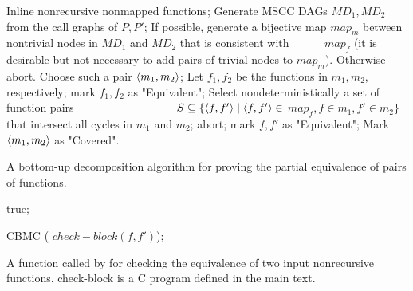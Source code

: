 \begin{algorithm}
\begin{algorithmic}[1]
\State \label{step:inline} Inline nonrecursive nonmapped functions;
\State \label{step:generate} Generate MSCC DAGs $MD_1, MD_2$
          from the call graphs of $P,P'$;
\State If possible,\label{step:possible} generate a bijective map $map_m$ between nontrivial nodes in $MD_1$ and $MD_2$ that is consistent with 
\mbox{~~~~~} $map_f$ (it is desirable but not necessary to add pairs of trivial nodes to $map_m$). Otherwise abort.
 \label{step:while}
  \State \label{step:choose} Choose such a pair $\langle m_1,m_2\rangle$;
   \label{step:m1}
    \State Let $f_1,f_2$ be the functions in $m_1,m_2$, respectively;
     \label{step:Check}
          {mark $f_1,f_2$ as "Equivalent"; }
    \EndIf \label{step:m1endIf}
    \Else
      \State \label{step:select}Select nondeterministically a set of function pairs \newline \mbox{~~~~~~~~~~~~~~~~~} $S \subseteq \{\langle f,f'\rangle\mid \langle f,f'\rangle \in$ $map_f, f \in m_1, f' \in m_2\}$ that intersect all cycles in $m_1$ and $m_2$;
      \label{step:forall}
        \label{step:abort}{abort;} 
        \EndIf
      \EndFor
       \label{step:forall2}
         mark $f,f'$ as "Equivalent";
      \EndFor
  \EndIf \label{step:selectEnd}
\State \label{step:mark} Mark $\langle m_1,m_2\rangle$ as "Covered".
\EndWhile
\EndFunction
\end{algorithmic}
\caption{A bottom-up decomposition algorithm for proving the partial equivalence of pairs of functions.}
\label{alg:Prove}
\end{algorithm}


\begin{algorithm}
\begin{algorithmic}[1]


 true;

\EndIf

 CBMC ( $check-block (f,f')$);

\EndFunction
\end{algorithmic}
\caption{A function called by  for checking the equivalence of two
input nonrecursive functions. check-block is a C program defined in the main text.}
\label{alg:Check}
\end{algorithm}

